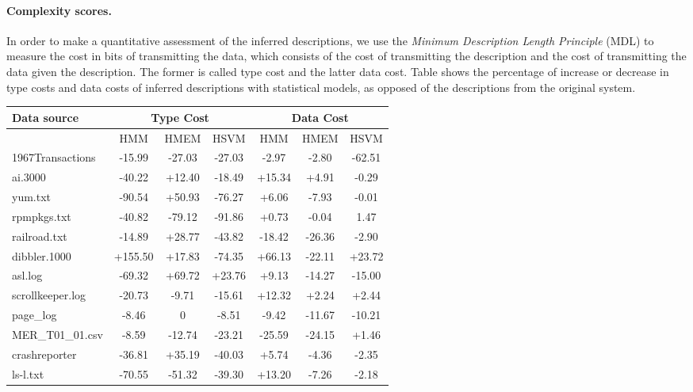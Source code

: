 \paragraph*{Complexity scores.}

In order to make a quantitative assessment of the inferred
descriptions, we use the {\em Minimum Description Length Principle}
(MDL) to measure the cost in bits of transmitting the
data, which consists of the cost of transmitting the description and
the cost of transmitting the data given the description. The former
is called type cost and the latter data cost. Table shows the
percentage of increase or decrease in type costs and data costs of
inferred descriptions with statistical models, as opposed of the
descriptions from the original \learnpads{} system.

\begin{table}
\begin{center}
\begin{tabular}{|l||c|c|c||c|c|c|}\hline
Data source & \multicolumn{3}{|c||}{Type Cost} &
\multicolumn{3}{|c|}{Data Cost}\\ \hline & HMM & HMEM & HSVM & HMM &
HMEM & HSVM \\ \hline 
1967Transactions & -15.99 & -27.03 & -27.03 & -2.97
& -2.80 & -62.51    \\\hline 
ai.3000 & -40.22 & +12.40 & -18.49 & +15.34 & +4.91 & -0.29 \\ \hline
yum.txt & -90.54 & +50.93 & -76.27 & +6.06 & -7.93 & -0.01  \\ \hline
rpmpkgs.txt & -40.82 & -79.12 & -91.86 & +0.73 & -0.04 & 1.47 \\ \hline
railroad.txt & -14.89 & +28.77 & -43.82 & -18.42 & -26.36 & -2.90   \\ \hline
dibbler.1000 & +155.50 & +17.83 & -74.35 & +66.13 & -22.11 & +23.72    \\ \hline
asl.log & -69.32 & +69.72 & +23.76 & +9.13 & -14.27 & -15.00 \\ \hline
scrollkeeper.log & -20.73 & -9.71 & -15.61 & +12.32 & +2.24 & +2.44  \\ \hline
page\_log & -8.46 & 0 & -8.51 & -9.42 & -11.67 & -10.21 \\ \hline
MER\_T01\_01.csv & -8.59 & -12.74 & -23.21 & -25.59 & -24.15 & +1.46 \\ \hline
crashreporter & -36.81 & +35.19 & -40.03 & +5.74 & -4.36 & -2.35 \\ \hline
ls-l.txt & -70.55 & -51.32 & -39.30 & +13.20 & -7.26 & -2.18 \\ \hline

\end{tabular}
\end{center}
\end{table}
